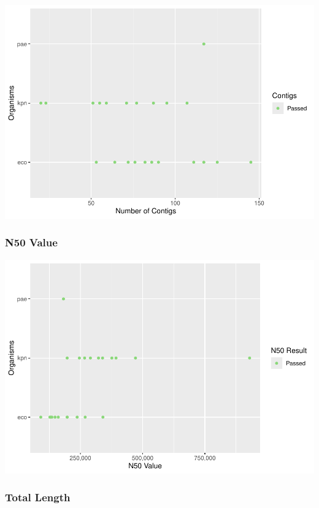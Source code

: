 \documentclass[
  a4paper,
]{article}
\begin{document}
\includegraphics{qualifyr_report_2024-05-03_files/figure-latex/unnamed-chunk-1-1.pdf}

\subsubsection{N50 Value}\label{n50-value}

\includegraphics{qualifyr_report_2024-05-03_files/figure-latex/n50_result -1.pdf}

\subsubsection{Total Length}\label{total-length}
\end{document}
